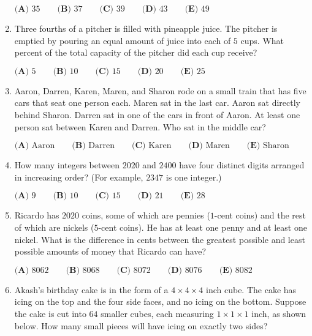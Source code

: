 \documentclass{article}
\begin{document}
\begin{enumerate}[label=\arabic*., itemsep=0.5em]
\(\textbf{(A) }35 \qquad \textbf{(B) }37 \qquad \textbf{(C) }39 \qquad \textbf{(D) }43 \qquad \textbf{(E) }49\)\par \vspace{0.5em}\item Three fourths of a pitcher is filled with pineapple juice. The pitcher is emptied by pouring an equal amount of juice into each of \(5\) cups. What percent of the total capacity of the pitcher did each cup receive? 

\(\textbf{(A) }5 \qquad \textbf{(B) }10 \qquad \textbf{(C) }15 \qquad \textbf{(D) }20 \qquad \textbf{(E) }25\)\par \vspace{0.5em}\item Aaron, Darren, Karen, Maren, and Sharon rode on a small train that has five cars that seat one person each. Maren sat in the last car. Aaron sat directly behind Sharon. Darren sat in one of the cars in front of Aaron. At least one person sat between Karen and Darren. Who sat in the middle car?

\(\textbf{(A) }\text{Aaron} \qquad \textbf{(B) }\text{Darren} \qquad \textbf{(C) }\text{Karen} \qquad \textbf{(D) }\text{Maren}\qquad \textbf{(E) }\text{Sharon}\)\par \vspace{0.5em}\item How many integers between \(2020\) and \(2400\) have four distinct digits arranged in increasing order? (For example, \(2347\) is one integer.)

\(\textbf{(A) }\text{9} \qquad \textbf{(B) }\text{10} \qquad \textbf{(C) }\text{15} \qquad \textbf{(D) }\text{21}\qquad \textbf{(E) }\text{28}\)\par \vspace{0.5em}\item Ricardo has \(2020\) coins, some of which are pennies (\(1\)-cent coins) and the rest of which are nickels (\(5\)-cent coins). He has at least one penny and at least one nickel. What is the difference in cents between the greatest possible and least possible amounts of money that Ricardo can have?

\(\textbf{(A) }\text{8062} \qquad \textbf{(B) }\text{8068} \qquad \textbf{(C) }\text{8072} \qquad \textbf{(D) }\text{8076}\qquad \textbf{(E) }\text{8082}\)\par \vspace{0.5em}\item Akash's birthday cake is in the form of a \(4 \times 4 \times 4\) inch cube. The cake has icing on the top and the four side faces, and no icing on the bottom. Suppose the cake is cut into \(64\) smaller cubes, each measuring \(1 \times 1 \times 1\) inch, as shown below. How many small pieces will have icing on exactly two sides?



\end{enumerate}
\end{document}
